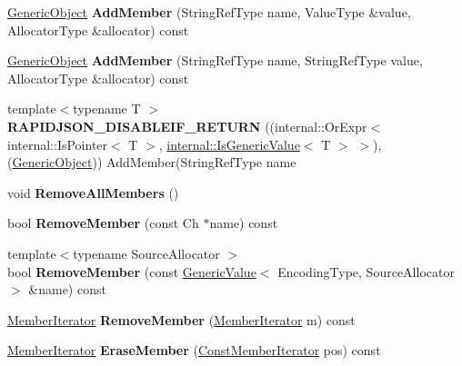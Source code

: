 \begin{DoxyCompactItemize}
\item 
\hyperlink{a00120}{Generic\+Object} {\bfseries Add\+Member} (String\+Ref\+Type name, Value\+Type \&value, Allocator\+Type \&allocator) const \hypertarget{a00120_a245647b72d87ffe6142d1c656f0e92d8}{}\label{a00120_a245647b72d87ffe6142d1c656f0e92d8}

\item 
\hyperlink{a00120}{Generic\+Object} {\bfseries Add\+Member} (String\+Ref\+Type name, String\+Ref\+Type value, Allocator\+Type \&allocator) const \hypertarget{a00120_a5cb6c166992abe5674a287bbc02d8f2f}{}\label{a00120_a5cb6c166992abe5674a287bbc02d8f2f}

\item 
{\footnotesize template$<$typename T $>$ }\\{\bfseries R\+A\+P\+I\+D\+J\+S\+O\+N\+\_\+\+D\+I\+S\+A\+B\+L\+E\+I\+F\+\_\+\+R\+E\+T\+U\+RN} ((internal\+::\+Or\+Expr$<$ internal\+::\+Is\+Pointer$<$ T $>$, \hyperlink{a00184}{internal\+::\+Is\+Generic\+Value}$<$ T $>$ $>$),(\hyperlink{a00120}{Generic\+Object})) Add\+Member(String\+Ref\+Type name\hypertarget{a00120_af361a4b677882964789201fc605541d0}{}\label{a00120_af361a4b677882964789201fc605541d0}

\item 
void {\bfseries Remove\+All\+Members} ()\hypertarget{a00120_a129ce3843a6658e620a7f740d9f44ee1}{}\label{a00120_a129ce3843a6658e620a7f740d9f44ee1}

\item 
bool {\bfseries Remove\+Member} (const Ch $\ast$name) const \hypertarget{a00120_a64bfcf1671efa5de04cc7659a014a29d}{}\label{a00120_a64bfcf1671efa5de04cc7659a014a29d}

\item 
{\footnotesize template$<$typename Source\+Allocator $>$ }\\bool {\bfseries Remove\+Member} (const \hyperlink{a00130}{Generic\+Value}$<$ Encoding\+Type, Source\+Allocator $>$ \&name) const \hypertarget{a00120_acca9953e3c2e6df16d7685572ac3fe9d}{}\label{a00120_acca9953e3c2e6df16d7685572ac3fe9d}

\item 
\hyperlink{a00118}{Member\+Iterator} {\bfseries Remove\+Member} (\hyperlink{a00118}{Member\+Iterator} m) const \hypertarget{a00120_a2489d8522f3c38324df69f6184cd639a}{}\label{a00120_a2489d8522f3c38324df69f6184cd639a}

\item 
\hyperlink{a00118}{Member\+Iterator} {\bfseries Erase\+Member} (\hyperlink{a00118}{Const\+Member\+Iterator} pos) const \hypertarget{a00120_a85ed6e1f586c775a02aaa99d0deabcb4}{}\label{a00120_a85ed6e1f586c775a02aaa99d0deabcb4}


\end{DoxyCompactItemize}
